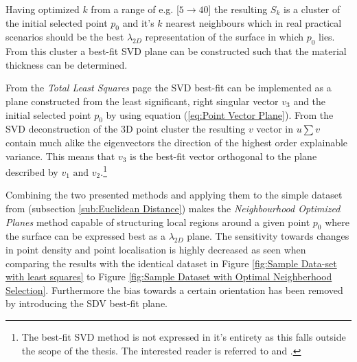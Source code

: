 \documentclass[%
]{USN-MSc}
\begin{document}
Having optimized \(k\) from a range of e.g. [\(5 \to 40\)] the resulting \(S_k\) is a cluster of the initial selected point \(p_0\) and it's \(k\) nearest neighbours which in real practical scenarios should be the best \(\lambda_{2D}\) representation of the surface in which \(p_0\) lies. From this cluster a best-fit SVD plane can be constructed such that the material thickness can be determined.

From the \textit{Total Least Squares} page \cite{Total-Least-Squares} the SVD best-fit can be implemented as a plane constructed from the least significant, right singular  vector \(v_3\) and the initial selected point \(p_0\) by using equation (\ref{eq:Point Vector Plane}). From the SVD deconstruction of the 3D point cluster the resulting \(v\) vector in \(u\sum v\) contain much alike the eigenvectors the direction of the highest order explainable variance. This means that \(v_3\) is the best-fit vector orthogonal to the plane described by \(v_1 \text{ and } v_2\).\footnote{The best-fit SVD method is not expressed in it's entirety as this falls outside the scope of the thesis. The interested reader is referred to \cite{Total-Least-Squares} and \cite{3d-svd}.}
\clearpage

Combining the two presented methods and applying them to the simple dataset from (subsection \ref{sub:Euclidean Distance}) makes the \textit{Neighbourhood Optimized Planes} method capable of structuring local regions around a given point \(p_0\) where the surface can be expressed best as a \(\lambda_{2D}\) plane. The sensitivity towards changes in point density and point localisation is highly decreased as seen when comparing the results with the identical dataset in Figure \ref{fig:Sample Data-set with least squares} to Figure \ref{fig:Sample Dataset with Optimal Neighberhood Selection}. Furthermore the bias towards a certain orientation has been removed by introducing the SDV best-fit plane. 
\end{document}

